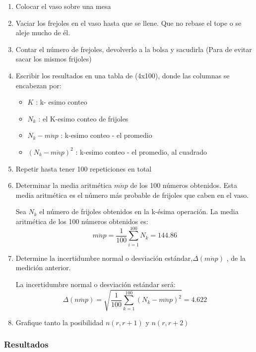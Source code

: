 \begin{enumerate}
    \item Colocar el vaso sobre una mesa
    \item Vaciar los frejoles en el vaso hasta que se llene. Que no rebase el tope o se aleje mucho de él.
    \item Contar el número de frejoles, devolverlo a la bolsa y sacudirla (Para de evitar sacar los mismos frijoles)
    \item Escribir los resultados en una tabla de (4x100), donde las columnas se encabezan por:
    \begin{itemize}
        \item $K$ : k- esimo conteo 
        \item $N_k$ : el K-esimo conteo de frijoles
        \item $N_k - \overline{mnp}$ :  k-esimo conteo - el promedio 
        \item $(N_k - \overline{mnp})^2$ : k-esimo conteo - el promedio, al cuadrado
    \end{itemize}
    \item Repetir hasta tener 100 repeticiones en total
    \item Determinar la media aritmética $\overline{mnp}$ de los 100 números obtenidos. Esta media aritmética es el número más probable de frijoles que caben en el vaso.

    Sea $N_k$ el número de frijoles obtenidos en la k-ésima operación. La media aritmética de los 100 números obtenidos es:
    \begin{equation*}
        \overline{mnp}=\dfrac{1}{100}\sum_{i=1}^{100} N_k = 144.86
    \end{equation*}
    \item Determine la incertidumbre normal o desviación estándar,$\Delta(\overline{mnp})$ , de la medición anterior.

    La incertidumbre normal o desviación estándar será:
    \begin{equation*}
    \Delta(\overline{n m p})=\sqrt{\frac{1}{100} \sum_{k=1}^{100}\left(N_k-\overline{mnp}\right)^2}=4.622
    \end{equation*}
    \item Grafique tanto la posibilidad $n(r,r+1)$ y $n(r,r+2)$

\end{enumerate}

\newpage
\subsubsection{Resultados} 

